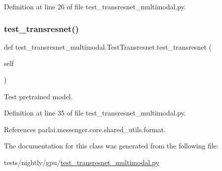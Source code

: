 Definition at line 26 of file test\+\_\+transresnet\+\_\+multimodal.\+py.

\mbox{\label{classtest__transresnet__multimodal_1_1TestTransresnet_a812e5b711af8dfc4edd18dd4862928d5}} 
\subsubsection{\texorpdfstring{test\+\_\+transresnet()}{test\_transresnet()}}
{\footnotesize\ttfamily def test\+\_\+transresnet\+\_\+multimodal.\+Test\+Transresnet.\+test\+\_\+transresnet (\begin{DoxyParamCaption}\item[{}]{self }\end{DoxyParamCaption})}

\begin{DoxyVerb}Test pretrained model.\end{DoxyVerb}
 

Definition at line 35 of file test\+\_\+transresnet\+\_\+multimodal.\+py.



References parlai.\+messenger.\+core.\+shared\+\_\+utils.\+format.



The documentation for this class was generated from the following file\+:\begin{DoxyCompactItemize}
\item 
tests/nightly/gpu/\hyperlink{test__transresnet__multimodal_8py}{test\+\_\+transresnet\+\_\+multimodal.\+py}\end{DoxyCompactItemize}
